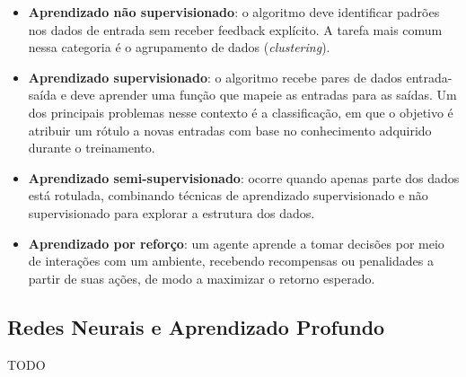 \documentclass[12pt]{article}
\begin{document}
\begin{itemize}
    \item \textbf{Aprendizado não supervisionado}: o algoritmo deve identificar padrões nos dados de entrada sem receber feedback explícito. A tarefa mais comum nessa categoria é o agrupamento de dados (\textit{clustering}).
    
    \item \textbf{Aprendizado supervisionado}: o algoritmo recebe pares de dados entrada-saída e deve aprender uma função que mapeie as entradas para as saídas. Um dos principais problemas nesse contexto é a classificação, em que o objetivo é atribuir um rótulo a novas entradas com base no conhecimento adquirido durante o treinamento.
    
    \item \textbf{Aprendizado semi-supervisionado}: ocorre quando apenas parte dos dados está rotulada, combinando técnicas de aprendizado supervisionado e não supervisionado para explorar a estrutura dos dados.
    
    \item \textbf{Aprendizado por reforço}: um agente aprende a tomar decisões por meio de interações com um ambiente, recebendo recompensas ou penalidades a partir de suas ações, de modo a maximizar o retorno esperado.
\end{itemize}

\subsection{Redes Neurais e Aprendizado Profundo}
\label{sec:review:deep_learning}

TODO
\end{document}
